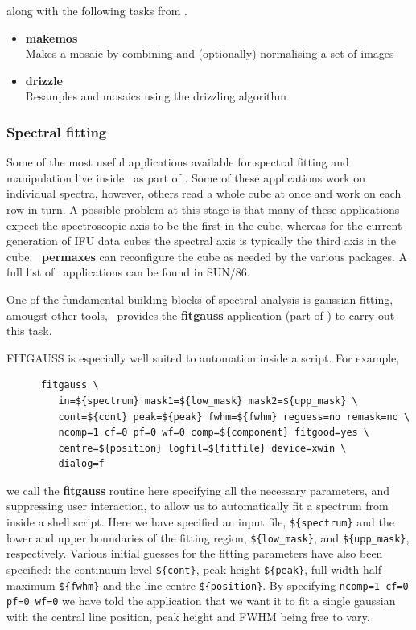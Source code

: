 \documentclass[twoside,11pt]{article}
\newcommand{\xref}[3]{#1}
\begin{document}
{along with the following tasks from \CCDPACKref.

\begin{itemize}
\item{\xref{{\bf makemos}}{sun139}{MAKEMOS}}\\
Makes a mosaic by combining and (optionally) normalising a set of images 
\item{\xref{{\bf drizzle}}{sun139}{DRIZZLE}}\\
Resamples and mosaics using the drizzling algorithm
\end{itemize}

\subsubsection{Spectral fitting\label{spectral_fitting}}

Some of the most useful applications available for spectral fitting
and manipulation live inside \FIGAROref\ as part of \SPECDREref.  Some
of these applications work on individual spectra, however, others read
a whole cube at once and work on each row in turn.  A possible problem
at this stage is that many of these applications expect the
spectroscopic axis to be the first in the cube, whereas for the
current generation of IFU data cubes the spectral axis is typically the
third axis in the cube.  \KAPPA\ \xref{{\bf permaxes}}{sun95}{PERMAXES}
can reconfigure the cube as needed by the various packages.   A full 
list of \xref{\SPECDRE\ applications}{sun86}{classifspecdre} can be 
found in SUN/86. 

One of the fundamental building blocks of spectral analysis is
gaussian fitting, amougst other tools, \FIGARO\ provides the
\xref{{\bf fitgauss}}{sun86}{FITGAUSS} application (part of \SPECDRE)
to carry out this task.

FITGAUSS is especially well suited to automation inside a script.
For example,

\small\begin{verbatim}
      fitgauss \
         in=${spectrum} mask1=${low_mask} mask2=${upp_mask} \
         cont=${cont} peak=${peak} fwhm=${fwhm} reguess=no remask=no \
         ncomp=1 cf=0 pf=0 wf=0 comp=${component} fitgood=yes \
         centre=${position} logfil=${fitfile} device=xwin \
         dialog=f 
\end{verbatim}\normalsize

we call the {\bf fitgauss} routine here specifying all the necessary
parameters, and suppressing user interaction, to allow us to
automatically fit a spectrum from inside a shell script.  Here we have
specified an input file, \verb+${spectrum}+ and the lower and upper
boundaries of the fitting region, \verb+${low_mask}+, and
\verb+${upp_mask}+, respectively.  Various initial guesses for the
fitting parameters have also been specified: the continuum level
\verb+${cont}+, peak height \verb+${peak}+, full-width half-maximum
\verb+${fwhm}+ and the line centre \verb+${position}+.  By specifying
\verb+ncomp=1 cf=0 pf=0 wf=0+ we have told the application that we
want it to fit a single gaussian with the central line position, peak
height and FWHM being free to vary.

}
\end{document}
